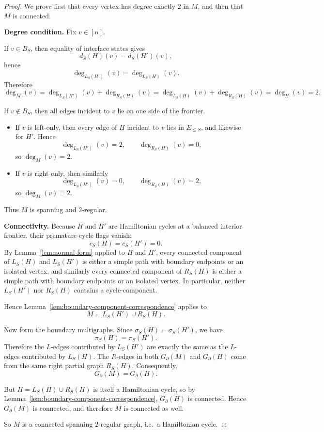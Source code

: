 \documentclass[11pt]{article}
\begin{document}
\begin{proof}
We prove first that every vertex has degree exactly $2$ in $M$, and then that $M$ is connected.

\medskip
\noindent
\textbf{Degree condition.}
Fix $v\in[n]$.

If $v\in B_S$, then equality of interface states gives
\[
d_S(H)(v)=d_S(H')(v),
\]
hence
\[
\deg_{L_S(H')}(v)=\deg_{L_S(H)}(v).
\]
Therefore
\[
\deg_M(v)
=
\deg_{L_S(H')}(v)+\deg_{R_S(H)}(v)
=
\deg_{L_S(H)}(v)+\deg_{R_S(H)}(v)
=
\deg_H(v)
=
2.
\]

If $v\notin B_S$, then all edges incident to $v$ lie on one side of the frontier.

\begin{itemize}
    \item If $v$ is left-only, then every edge of $H$ incident to $v$ lies in $E_{\le S}$, and likewise
    for $H'$. Hence
    \[
    \deg_{L_S(H')}(v)=2,\qquad \deg_{R_S(H)}(v)=0,
    \]
    so $\deg_M(v)=2$.

    \item If $v$ is right-only, then similarly
    \[
    \deg_{L_S(H')}(v)=0,\qquad \deg_{R_S(H)}(v)=2,
    \]
    so $\deg_M(v)=2$.
\end{itemize}

Thus $M$ is spanning and $2$-regular.

\medskip
\noindent
\textbf{Connectivity.}
Because $H$ and $H'$ are Hamiltonian cycles at a balanced interior frontier, their premature-cycle
flags vanish:
\[
c_S(H)=c_S(H')=0.
\]
By Lemma~\ref{lem:normal-form} applied to $H$ and $H'$, every connected component
of $L_S(H)$ and $L_S(H')$ is either a simple path with boundary endpoints or an isolated vertex,
and similarly every connected component of $R_S(H)$ is either a simple path with boundary endpoints
or an isolated vertex. In particular, neither $L_S(H')$ nor $R_S(H)$ contains a cycle-component.

Hence Lemma~\ref{lem:boundary-component-correspondence} applies to
\[
M=L_S(H')\cup R_S(H).
\]

Now form the boundary multigraphs. Since $\sigma_S(H)=\sigma_S(H')$, we have
\[
\pi_S(H)=\pi_S(H').
\]
Therefore the $L$-edges contributed by $L_S(H')$ are exactly the same as the $L$-edges contributed
by $L_S(H)$. The $R$-edges in both $G_\partial(M)$ and $G_\partial(H)$ come from the same right
partial graph $R_S(H)$. Consequently,
\[
G_\partial(M)=G_\partial(H).
\]

But $H=L_S(H)\cup R_S(H)$ is itself a Hamiltonian cycle, so by
Lemma~\ref{lem:boundary-component-correspondence}, $G_\partial(H)$ is connected. Hence
$G_\partial(M)$ is connected, and therefore $M$ is connected as well.

So $M$ is a connected spanning $2$-regular graph, i.e.\ a Hamiltonian cycle.
\end{proof}
\end{document}
